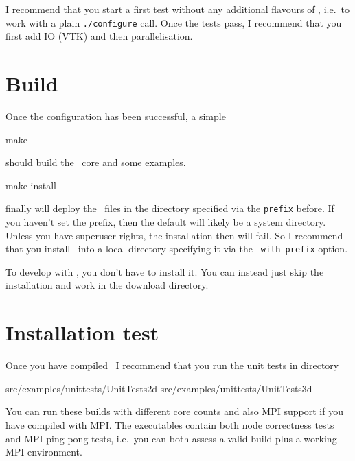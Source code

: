 \begin{remark}
 I recommend that you start a first test without any additional flavours of
 \Peano, i.e.~to work with a plain \texttt{./configure} call. Once the tests
 pass, I recommend that you first add IO (VTK) and then parallelisation.
\end{remark}

\section{Build}

Once the configuration has been successful, a simple 
\begin{code}
make
\end{code}
should build the \Peano\ core and some examples.


\begin{code}
make install
\end{code}
finally will deploy the \Peano\ files in the directory specified via the
\texttt{prefix} before.
If you haven't set the prefix, then the default will likely be a system
directory.
Unless you have superuser rights, the installation then will fail.
So I recommend that you install \Peano\ into a local directory specifying it via
the \texttt{--with-prefix} option.


\begin{remark}
 To develop with \Peano, you don't have to install it. You can instead just skip
 the installation and work in the download directory.
\end{remark}




\section{Installation test}

Once you have compiled \Peano\, I recommend that you run the unit tests in
directory

\begin{code}
  src/examples/unittests/UnitTests2d
  src/examples/unittests/UnitTests3d
\end{code}

\noindent
You can run these builds with different core counts and also MPI support if you
have compiled with MPI.
The executables contain both node correctness tests and MPI ping-pong tests,
i.e.~you can both assess a valid build plus a working MPI environment.



